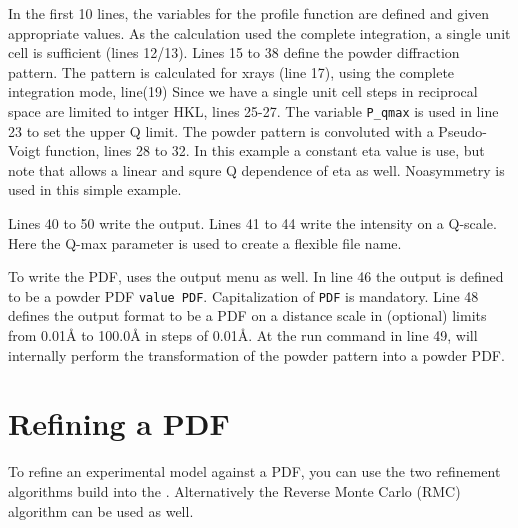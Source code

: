 In the first 10 lines, the variables for the profile function are defined
and given appropriate values. As the calculation used the complete
integration, a single unit cell is sufficient (lines 12/13). 
Lines 15 to 38 define the powder diffraction pattern. The pattern is
calculated for xrays (line 17), using the complete integration mode, line(19)
Since we have a single unit cell steps in reciprocal space are limited to intger 
HKL, lines 25-27. The variable {\tt P\_qmax} is used in line 23 to set the 
upper Q limit. The powder pattern is convoluted with a Pseudo-Voigt function,
lines 28 to 32. In this example a constant eta value is use, but note that \Discus
allows a linear and squre Q dependence of eta as well. Noasymmetry is used in 
this simple example.

Lines 40 to 50 write the output. Lines 41 to 44 write the intensity on a Q-scale.
Here the Q-max parameter is used to create a flexible file name.

To write the PDF, \Discus uses the output menu as well. In line 46 the output
is defined to be a powder PDF {\tt value PDF}. Capitalization of {\tt PDF} is
mandatory. Line 48 defines the output format to be a PDF on a distance scale
in (optional) limits from 0.01\AA{} to 100.0\AA{} in steps of 0.01\AA.
At the run command in line 49, \Discus will internally perform the transformation
of the powder pattern into a powder PDF.



\section{Refining a PDF \label{pdf-rmc}}

To refine an experimental model against a PDF, you can use the two 
refinement algorithms build into the \Suite. Alternatively the 
Reverse Monte Carlo (RMC) algorithm can be used as well.

